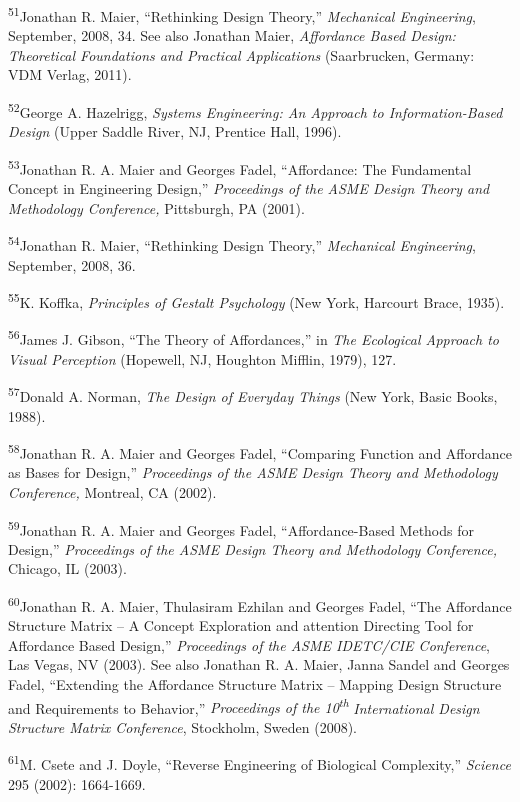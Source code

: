 \textsuperscript{51}Jonathan R. Maier, “Rethinking Design Theory,”
\textit{Mechanical Engineering},\textit{ }September, 2008, 34. See also
Jonathan Maier, \textit{Affordance Based Design: Theoretical
Foundations and Practical Applications }(Saarbrucken, Germany: VDM
Verlag, 2011).


\textsuperscript{52}George A. Hazelrigg, \textit{Systems Engineering: An
Approach to Information-Based Design }(Upper Saddle River, NJ, Prentice
Hall, 1996).


\textsuperscript{53}Jonathan R. A. Maier and Georges Fadel, “Affordance:
The Fundamental Concept in Engineering Design,” \textit{Proceedings of
the ASME Design Theory and Methodology Conference, }Pittsburgh, PA
(2001).


\textsuperscript{54}Jonathan R. Maier, “Rethinking Design Theory,”
\textit{Mechanical Engineering},\textit{ }September, 2008, 36.


\textsuperscript{55}K. Koffka, \textit{Principles of Gestalt Psychology
}(New York, Harcourt Brace, 1935).


\textsuperscript{56}James J. Gibson, “The Theory of Affordances,” in
\textit{The Ecological Approach to Visual Perception }(Hopewell, NJ,
Houghton Mifflin, 1979), 127.


\textsuperscript{57}Donald A. Norman, \textit{The Design of Everyday
Things }(New York, Basic Books, 1988).


\textsuperscript{58}Jonathan R. A. Maier and Georges Fadel, “Comparing
Function and Affordance as Bases for Design,” \textit{Proceedings of
the ASME Design Theory and Methodology Conference, }Montreal, CA
(2002).


\textsuperscript{59}Jonathan R. A. Maier and Georges Fadel,
“Affordance-Based Methods for Design,” \textit{Proceedings of the ASME
Design Theory and Methodology Conference, }Chicago, IL (2003).


\textsuperscript{60}Jonathan R. A. Maier, Thulasiram Ezhilan and Georges
Fadel, “The Affordance Structure Matrix – A Concept Exploration and
attention Directing Tool for Affordance Based Design,”
\textit{Proceedings of the ASME IDETC/CIE Conference},\textit{ }Las
Vegas, NV (2003). See also Jonathan R. A. Maier, Janna Sandel and
Georges Fadel, “Extending the Affordance Structure Matrix – Mapping
Design Structure and Requirements to Behavior,” \textit{Proceedings of
the 10}\textit{\textsuperscript{th}}\textit{ International Design
Structure Matrix Conference},\textit{ }Stockholm, Sweden (2008).


\textsuperscript{61}M. Csete and J. Doyle, “Reverse Engineering of
Biological Complexity,” \textit{Science} 295 (2002): 1664-1669.


